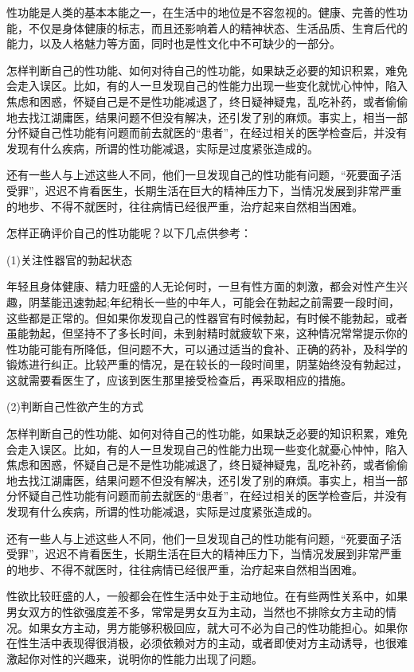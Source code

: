 \documentclass[12pt,UTF8]{ctexbook}
\begin{document}
性功能是人类的基本本能之一，在生活中的地位是不容忽视的。健康、完善的性功能，不仅是身体健康的标志，而且还影响着人的精神状态、生活品质、生育后代的能力，以及人格魅力等方面，同时也是性文化中不可缺少的一部分。

怎样判断自己的性功能、如何对待自己的性功能，如果缺乏必要的知识积累，难免会走入误区。比如，有的人一旦发现自己的性能力出现一些变化就忧心忡忡，陷入焦虑和困惑，怀疑自己是不是性功能减退了，终日疑神疑鬼，乱吃补药，或者偷偷地去找江湖庸医，结果问题不但没有解决，还引发了别的麻烦。事实上，相当一部分怀疑自己性功能有问题而前去就医的“患者”，在经过相关的医学检查后，并没有发现有什么疾病，所谓的性功能减退，实际是过度紧张造成的。

还有一些人与上述这些人不同，他们一旦发现自己的性功能有问题，“死要面子活受罪”，迟迟不肯看医生，长期生活在巨大的精神压力下，当情况发展到非常严重的地步、不得不就医时，往往病情已经很严重，治疗起来自然相当困难。

怎样正确评价自己的性功能呢？以下几点供参考：

(1)关注性器官的勃起状态

年轻且身体健康、精力旺盛的人无论何时，一旦有性方面的刺激，都会对性产生兴趣，阴茎能迅速勃起;年纪稍长一些的中年人，可能会在勃起之前需要一段时间，这些都是正常的。但如果你发现自己的性器官有时候勃起，有时候不能勃起，或者虽能勃起，但坚持不了多长时间，未到射精时就疲软下来，这种情况常常提示你的性功能可能有所降低，但问题不大，可以通过适当的食补、正确的药补，及科学的锻炼进行纠正。比较严重的情况，是在较长的一段时间里，阴茎始终没有勃起过，这就需要看医生了，应该到医生那里接受检查后，再采取相应的措施。

(2)判断自己性欲产生的方式

怎样判断自己的性功能、如何对待自己的性功能，如果缺乏必要的知识积累，难免会走入误区。比如，有的人一旦发现自己的性能力出现一些变化就憂心忡忡，陷入焦虑和困惑，怀疑自己是不是性功能减退了，终日疑神疑鬼，乱吃补药，或者偷偷地去找江湖庸医，结果问题不但没有解决，还引发了别的麻煩。事实上，相当一部分怀疑自己性功能有问题而前去就医的“患者”，在经过相关的医学检查后，并没有发现有什么疾病，所谓的性功能减退，实际是过度紧张造成的。

还有一些人与上述这些人不同，他们一旦发现自己的性功能有问题，“死要面子活受罪”，迟迟不肯看医生，长期生活在巨大的精神压力下，当情况发展到非常严重的地步、不得不就医时，往往病情已经很严重，治疗起来自然相当困难。

性欲比较旺盛的人，一般都会在性生活中处于主动地位。在有些两性关系中，如果男女双方的性欲强度差不多，常常是男女互为主动，当然也不排除女方主动的情况。如果女方主动，男方能够积极回应，就大可不必为自己的性功能担心。如果你在性生活中表现得很消极，必须依赖对方的主动，或者即使对方主动诱导，也很难激起你对性的兴趣来，说明你的性能力出现了问题。
\end{document}
